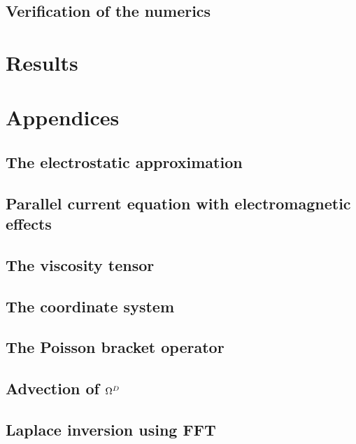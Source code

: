 \documentclass[12pt,a4paper,oneside,openright]{report} %
\begin{document}
\chapter{Verification of the numerics}
\label{app:verification}


\part{Results}

\part{Appendices}
\appendix

\chapter{The electrostatic approximation}
\label{app:elstat}


\chapter{Parallel current equation with electromagnetic effects}
\label{app:elMag}


\chapter{The viscosity tensor}
\label{app:piTensor}


\chapter{The coordinate system}
\label{app:coord}


\chapter{The Poisson bracket operator}
\label{app:poisson}


\chapter{Advection of \texorpdfstring{$\Omega^D$}{OmegaD}}
\label{app:vortDAdv}

\chapter{Laplace inversion using FFT}
\label{app:lapInv}
\end{document}
